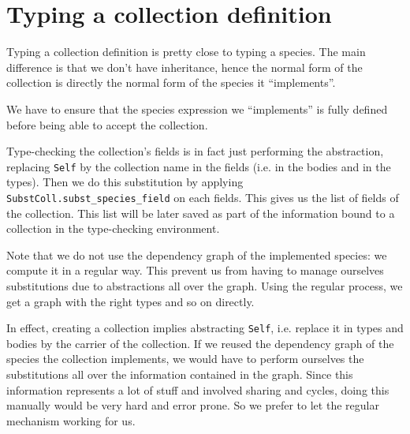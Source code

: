 \section{Typing a collection definition}
Typing a collection definition is pretty close to typing a
species. The main difference is that we don't have inheritance, hence
the normal form of the collection is directly the normal form of the
species it ``implements''.

\medskip
We have to ensure that the species expression we ``implements'' is
fully defined before being able to accept the collection.

\medskip
Type-checking the collection's fields is in fact just performing the
abstraction, replacing {\tt Self} by the collection name in the fields
(i.e. in the bodies and in the types). Then we do this substitution by
applying {\tt SubstColl.subst\_species\_field} on each fields. This
gives us the list of fields of the collection. This list will be later
saved as part of the information bound to a collection in the
type-checking environment.

\medskip
Note that we do not use the dependency graph of the implemented
species: we compute it in a regular way. This prevent us from having
to manage ourselves substitutions due to abstractions all over the
graph. Using the regular process, we get a graph with the right types
and so on directly.

In effect, creating a collection implies abstracting {\tt Self},
i.e. replace it in types and bodies by the carrier of the
collection. If we reused the dependency graph of the species the
collection implements, we would have to perform ourselves the
substitutions all over the information contained in the graph. Since
this information represents a lot of stuff and involved sharing and
cycles, doing this manually would be very hard and error prone. So we
prefer to let the regular mechanism working for us.
